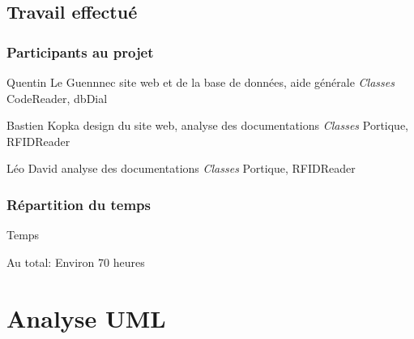\documentclass[10pt,handout,usepdftitle=false,envcountsect]{beamer}
\begin{document}
\subsection{Travail effectué}
\begin{frame}

\frametitle{Participants au projet}
    \begin{block}{Quentin Le Guennnec}
        site web et de la base de données, aide générale
        \newline\emph{Classes} CodeReader, dbDial
    \end{block}
    \begin{block}{Bastien Kopka} 
        design du site web, analyse des documentations
        \newline\emph{Classes} Portique, RFIDReader
    \end{block}
    \begin{block}{Léo David} 
        analyse des documentations
        \newline\emph{Classes} Portique, RFIDReader
        \newline
    \end{block}
\end{frame}

\begin{frame}
\frametitle{Répartition du temps}
\begin{alertblock}{Temps}
\end{alertblock}
\centering\begin{exampleblock}{Au total:} 
Environ 70 heures
\end{exampleblock}
\end{frame}


\section{Analyse UML}
\end{document}
